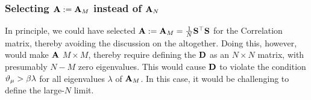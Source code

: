 \subsubsection{Selecting \texorpdfstring{$\mathbf{A}:=\mathbf{A}_M$}{A:=A M} instead of 
\texorpdfstring{$\mathbf{A}_N$}{A N}}
\label{sxn:tanaka_end}
In principle, we could have selected $\mathbf{A}:=\mathbf{A}_M=\tfrac{1}{N}{\mathbf{S}}^{\top}{\mathbf{S}}$  for the \Student Correlation matrix,
thereby avoiding the discussion on the \DualityOfMeasures altogether.
Doing this, however, would make $\mathbf{A}$ $M\times M$, thereby
require defining the \SourceMatrix $\mathbf{D}$ as an
$N \times N$ matrix, with presumably $N-M$ zero eigenvalues.
This would cause $\mathbf{D}$ to violate the condition $\vartheta_{\mu} > \beta\lambda$
for all eigenvalues $\lambda$ of $\mathbf{A}_M$.
In this case, it would be challenging to define the large-$N$ limit.
